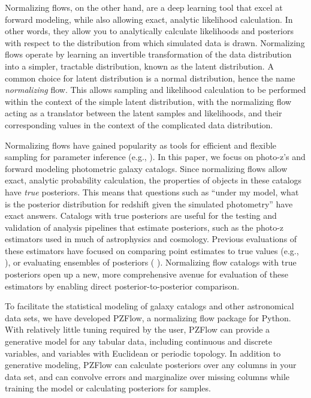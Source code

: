 \documentclass[twocolumn,twocolappendix,linenumbers]{aastex631}
\newcommand{\citePZp}{(\citetalias{schmidt2020} \citeyear{schmidt2020})\xspace}
\begin{document}
Normalizing flows, on the other hand, are a deep learning tool that excel at forward modeling, while also allowing exact, analytic likelihood calculation.
In other words, they allow you to analytically calculate likelihoods and posteriors with respect to the distribution from which simulated data is drawn.
Normalizing flows operate by learning an invertible transformation of the data distribution into a simpler, tractable distribution, known as the latent distribution.
A common choice for latent distribution is a normal distribution, hence the name \emph{normalizing} flow.
This allows sampling and likelihood calculation to be performed within the context of the simple latent distribution, with the normalizing flow acting as a translator between the latent samples and likelihoods, and their corresponding values in the context of the complicated data distribution.

Normalizing flows have gained popularity as tools for efficient and flexible sampling for parameter inference (e.g., \citealt{dai2022,dacunha2022,hassan2022}).
In this paper, we focus on photo-z's and forward modeling photometric galaxy catalogs.
Since normalizing flows allow exact, analytic probability calculation, the properties of objects in these catalogs have \emph{true} posteriors.
This means that questions such as ``under my model, what is the posterior distribution for redshift given the simulated photometry'' have exact answers.
Catalogs with true posteriors are useful for the testing and validation of analysis pipelines that estimate posteriors, such as the photo-z estimators used in much of astrophysics and cosmology.
Previous evaluations of these estimators have focused on comparing point estimates to true values (e.g., \citealt{hildebrandt2010,sanchez2014,graham2018}), or evaluating ensembles of posteriors \citePZp.
Normalizing flow catalogs with true posteriors open up a new, more comprehensive avenue for evaluation of these estimators by enabling direct posterior-to-posterior comparison.

To facilitate the statistical modeling of galaxy catalogs and other astronomical data sets, we have developed PZFlow, a normalizing flow package for Python.
With relatively little tuning required by the user, PZFlow can provide a generative model for any tabular data, including continuous and discrete variables, and variables with Euclidean or periodic topology.
In addition to generative modeling, PZFlow can calculate posteriors over any columns in your data set, and can convolve errors and marginalize over missing columns while training the model or calculating posteriors for samples.
\end{document}
